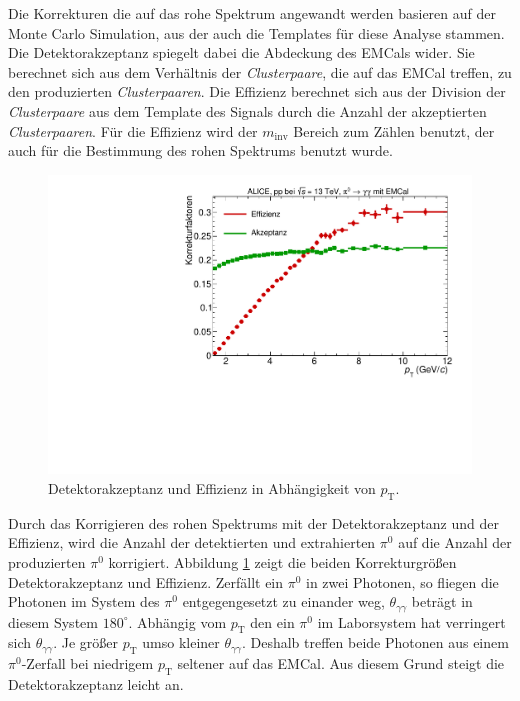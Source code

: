 Die Korrekturen die auf das rohe Spektrum angewandt werden basieren auf der Monte Carlo Simulation, aus der auch die Templates für diese Analyse stammen.
\newline
Die Detektorakzeptanz spiegelt dabei die Abdeckung des EMCals wider.
Sie berechnet sich aus dem Verhältnis der \textit{Clusterpaare}, die auf das EMCal treffen, zu den produzierten \textit{Clusterpaaren}.
\newline
Die Effizienz berechnet sich aus der Division der \textit{Clusterpaare} aus dem Template des Signals durch die Anzahl der akzeptierten \textit{Clusterpaaren}.
Für die Effizienz wird der $m_\text{inv}$ Bereich zum Zählen benutzt, der auch für die Bestimmung des rohen Spektrums benutzt wurde.
\begin{figure}[t] %
\centering
\includegraphics[width=.65\linewidth]{Korrekturfaktoren_Data_2016.pdf}
\caption{Detektorakzeptanz und Effizienz in Abhängigkeit von $p_\text{T}$.
}
\label{fig:Korrekturen}
\end{figure}
\newline
Durch das Korrigieren des rohen Spektrums mit der Detektorakzeptanz und der Effizienz, wird die Anzahl der detektierten und extrahierten $\pi^{0}$ auf die Anzahl der produzierten $\pi^{0}$ korrigiert.
Abbildung \ref{fig:Korrekturen} zeigt die beiden Korrekturgrößen Detektorakzeptanz und Effizienz.
\newline
Zerfällt ein $\pi^{0}$ in zwei Photonen, so fliegen die Photonen im System des $\pi^{0}$ entgegengesetzt zu einander weg, $\theta_{\gamma\gamma}$ beträgt in diesem System $180^{\circ}$.
Abhängig vom $p_\text{T}$ den ein $\pi^{0}$ im Laborsystem hat verringert sich $\theta_{\gamma\gamma}$.
Je größer $p_\text{T}$ umso kleiner $\theta_{\gamma\gamma}$.
Deshalb treffen beide Photonen aus einem $\pi^{0}$-Zerfall bei niedrigem $p_\text{T}$ seltener auf das EMCal.
Aus diesem Grund steigt die Detektorakzeptanz leicht an.
\newline
